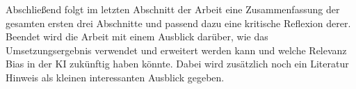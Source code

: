 \begin{onehalfspace}
    Abschließend folgt im letzten Abschnitt der Arbeit eine Zusammenfassung der gesamten ersten drei Abschnitte und passend dazu eine kritische Reflexion derer. Beendet wird die Arbeit mit einem Ausblick darüber, wie das Umsetzungsergebnis verwendet und erweitert werden kann und welche Relevanz Bias in der \ac*{KI} zukünftig haben könnte. Dabei wird zusätzlich noch ein Literatur Hinweis als kleinen interessanten Ausblick gegeben.
    \newpage
\end{onehalfspace}
